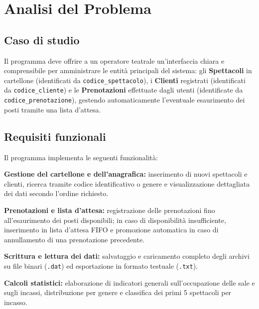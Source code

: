 \documentclass[11pt,a4paper,oneside,openany]{book}
\newenvironment{listacomp}{%
    \small
    \begin{list}{\textendash}{%
        \setlength{\topsep}{2pt}%
        \setlength{\partopsep}{0pt}%
        \setlength{\itemsep}{1pt}%
        \setlength{\parsep}{0pt}%
        \setlength{\leftmargin}{1.2em}%
    }%
}{%
    \end{list}%
}
\begin{document}
\chapter{Analisi del Problema}

\section{Caso di studio}
Il programma deve offrire a un operatore teatrale un'interfaccia chiara e comprensibile per amministrare le entità principali del sistema: gli \textbf{Spettacoli} in cartellone (identificati da \texttt{codice\_spettacolo}), i \textbf{Clienti} registrati (identificati da \texttt{codice\_cliente}) e le \textbf{Prenotazioni} effettuate dagli utenti (identificate da \texttt{codice\_prenotazione}), gestendo automaticamente l'eventuale esaurimento dei posti tramite una lista d'attesa.

\section{Requisiti funzionali}
Il programma implementa le seguenti funzionalità:
\begin{listacomp}
    \item \textbf{Gestione del cartellone e dell'anagrafica:} inserimento di nuovi spettacoli e clienti, ricerca tramite codice identificativo o genere e visualizzazione dettagliata dei dati secondo l'ordine richiesto.
    \item \textbf{Prenotazioni e lista d'attesa:} registrazione delle prenotazioni fino all'esaurimento dei posti disponibili; in caso di disponibilità insufficiente, inserimento in lista d'attesa FIFO e promozione automatica in caso di annullamento di una prenotazione precedente.
    \item \textbf{Scrittura e lettura dei dati:} salvataggio e caricamento completo degli archivi su file binari (\texttt{.dat}) ed esportazione in formato testuale (\texttt{.txt}).
    \item \textbf{Calcoli statistici:} elaborazione di indicatori generali sull'occupazione delle sale e sugli incassi, distribuzione per genere e classifica dei primi 5 spettacoli per incasso.
\end{listacomp}

\end{document}
